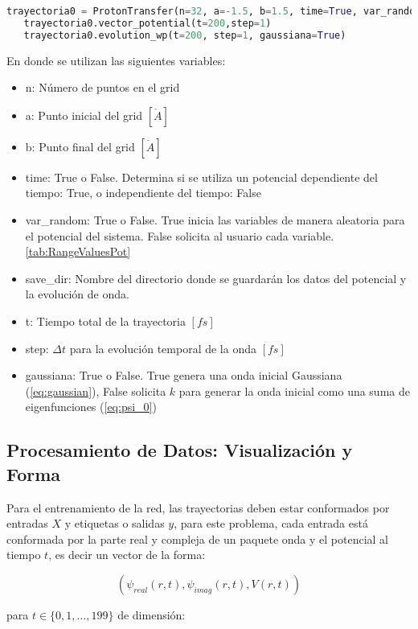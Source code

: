  \begin{lstlisting}[language=Python, morekeywords={ProtonTransfer, True, False}]
   trayectoria0 = ProtonTransfer(n=32, a=-1.5, b=1.5, time=True, var_random=True, save_dir='data0')
   trayectoria0.vector_potential(t=200,step=1)
   trayectoria0.evolution_wp(t=200, step=1, gaussiana=True)\end{lstlisting}

En donde se utilizan las siguientes variables:
\begin{itemize}[label=\textcolor{CTtitle}{\textbullet}]
\item n: Número de puntos en el grid
\item a: Punto inicial del grid $[\mathring{A}]$
\item b: Punto final del grid $[\mathring{A}]$
\item time: True o False. Determina si se utiliza un potencial dependiente del tiempo: True, o independiente del tiempo: False  
\item var\_random: True o False. True inicia las variables de manera aleatoria para el potencial del sistema. False solicita al usuario cada variable. \autoref{tab:RangeValuesPot}
\item save\_dir: Nombre del directorio donde se guardarán los datos del potencial y la evolución de onda.
\item t: Tiempo total de la trayectoria $[fs]$
\item step: $\Delta t$ para la evolución temporal de la onda $[fs]$
\item gaussiana: True o False. True genera una onda inicial Gaussiana (\autoref{eq:gaussian}), False solicita $k$ para generar la onda inicial como una suma de eigenfunciones (\autoref{eq:psi_0}) 
\end{itemize}

\subsection{Procesamiento de Datos: Visualización y Forma}

Para el entrenamiento de la red, las trayectorias deben estar conformados por entradas $X$ y etiquetas o salidas $y$, para este problema, cada entrada está conformada por la parte real y compleja de un paquete onda y el potencial al tiempo $t$, es decir un vector de la forma:

$$(\psi_{real}(r,t), \psi_{imag}(r,t),V(r,t))$$

para $t \in \{0,1,\dots,199\}$ de dimensión:

